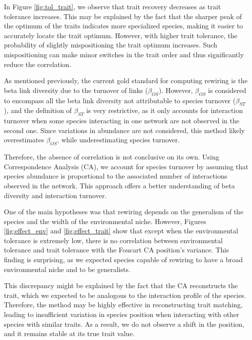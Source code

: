 In Figure \ref{fig:tol_trait}, we observe that trait recovery decreases as trait tolerance increases.
This may be explained by the fact that the sharper peak of the optimum of the traits indicates more specialized species, making it easier to accurately locate the trait optimum. However, with higher trait tolerance, the probability of slightly mispositioning the trait optimum increases. Such mispositioning can make minor switches in the trait order and thus significantly reduce the correlation.




As mentioned previously, the current gold standard for computing rewiring is the beta link diversity due to the turnover of links ($\beta_{OS}$). However, $\beta_{OS}$ is considered to encompass all the beta link diversity not attributable to species turnover ($\beta_{ST}$), and the definition of $\beta_{ST}$ is very restrictive, as it only accounts for interaction turnover when some species interacting in one network are not observed in the second one. Since variations in abundance are not considered, this method likely overestimates $\beta_{OS}$, while underestimating species turnover.


Therefore, the absence of correlation is not conclusive on its own. Using Correspondence Analysis (CA), we account for species turnover by assuming that species abundance is proportional to the associated number of interactions observed in the network. This approach offers a better understanding of beta diversity and interaction turnover.



One of the main hypotheses was that rewiring depends on the generalism of the species and the width of the environmental niche. However, Figures \ref{fig:effect_env} and \ref{fig:effect_trait} show that except when the environmental tolerance is extremely low, there is no correlation between environmental tolerance and trait tolerance with the Foucart CA position's variance. This finding is surprising, as we expected species capable of rewiring to have a broad environmental niche and to be generalists.

This discrepancy might be explained by the fact that the CA reconstructs the trait, which we expected to be analogous to the interaction profile of the species. Therefore, the method may be highly effective in reconstructing trait matching, leading to insufficient variation in species position when interacting with other species with similar traits. As a result,  we do not observe a shift in the position, and it remains stable at its true trait value.

